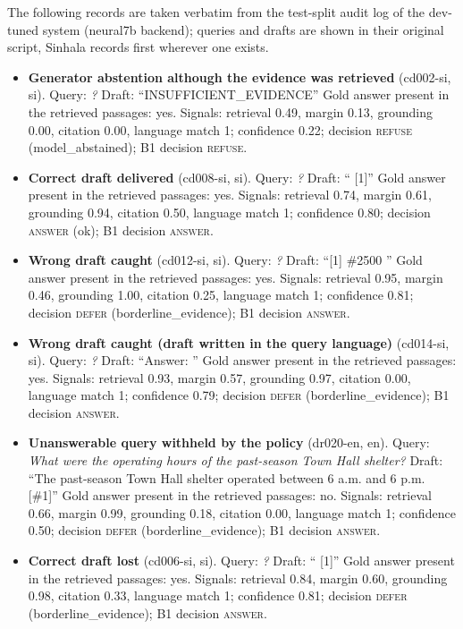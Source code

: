 The following records are taken verbatim from the test-split audit log of the dev-tuned system (neural7b backend); queries and drafts are shown in their original script, Sinhala records first wherever one exists.
\begin{itemize}
\item \textbf{Generator abstention although the evidence was retrieved} (cd002-si, si). Query: \emph{?} Draft: ``INSUFFICIENT\_EVIDENCE'' Gold answer present in the retrieved passages: yes. Signals: retrieval 0.49, margin 0.13, grounding 0.00, citation 0.00, language match 1; confidence 0.22; decision \textsc{refuse} (model\_abstained); B1 decision \textsc{refuse}.
\item \textbf{Correct draft delivered} (cd008-si, si). Query: \emph{?} Draft: `` [1]'' Gold answer present in the retrieved passages: yes. Signals: retrieval 0.74, margin 0.61, grounding 0.94, citation 0.50, language match 1; confidence 0.80; decision \textsc{answer} (ok); B1 decision \textsc{answer}.
\item \textbf{Wrong draft caught} (cd012-si, si). Query: \emph{?} Draft: ``[1] \#2500 '' Gold answer present in the retrieved passages: yes. Signals: retrieval 0.95, margin 0.46, grounding 1.00, citation 0.25, language match 1; confidence 0.81; decision \textsc{defer} (borderline\_evidence); B1 decision \textsc{answer}.
\item \textbf{Wrong draft caught (draft written in the query language)} (cd014-si, si). Query: \emph{?} Draft: ``Answer: '' Gold answer present in the retrieved passages: yes. Signals: retrieval 0.93, margin 0.57, grounding 0.97, citation 0.00, language match 1; confidence 0.79; decision \textsc{defer} (borderline\_evidence); B1 decision \textsc{answer}.
\item \textbf{Unanswerable query withheld by the policy} (dr020-en, en). Query: \emph{What were the operating hours of the past-season Town Hall shelter?} Draft: ``The past-season Town Hall shelter operated between 6 a.m. and 6 p.m. [\#1]'' Gold answer present in the retrieved passages: no. Signals: retrieval 0.66, margin 0.99, grounding 0.18, citation 0.00, language match 1; confidence 0.50; decision \textsc{defer} (borderline\_evidence); B1 decision \textsc{answer}.
\item \textbf{Correct draft lost} (cd006-si, si). Query: \emph{?} Draft: `` [1]'' Gold answer present in the retrieved passages: yes. Signals: retrieval 0.84, margin 0.60, grounding 0.98, citation 0.33, language match 1; confidence 0.81; decision \textsc{defer} (borderline\_evidence); B1 decision \textsc{answer}.
\end{itemize}
